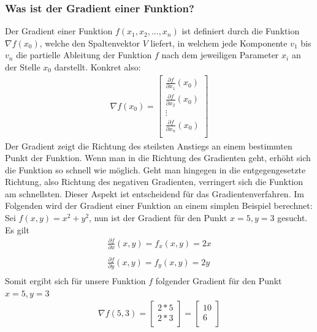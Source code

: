 \subsubsection{Was ist der Gradient einer Funktion?}\label{subsec:gradientenverfahren:was_ist_gradient}
  Der Gradient einer Funktion $f(x_{1}, x_{2}, ... , x_{n})$ ist definiert durch die Funktion $\nabla f(x_{0})$, welche den Spaltenvektor $V$ liefert, in welchem jede Komponente $v_1$ bis $v_n$ die partielle Ableitung der Funktion $f$ nach dem jeweiligen Parameter 
  $x_{i}$ an der Stelle $x_0$ darstellt. Konkret also: 
  \renewcommand{\arraystretch}{1.5}
  \begin{align*}
    \nabla f(x_0) =\begin{bmatrix}
          \frac{\partial f}{\partial x_{1}}(x_{0}) \\
          \frac{\partial f}{\partial x_{2}}(x_{0}) \\
           \vdots \\
           \frac{\partial f}{\partial x_{n}}(x_{0}) \\
         \end{bmatrix}
  \end{align*}
  \renewcommand{\arraystretch}{1}
  Der Gradient zeigt die Richtung des steilsten Anstiegs an einem bestimmten Punkt der Funktion. 
  Wenn man in die Richtung des Gradienten geht, erhöht sich die Funktion so schnell wie möglich. 
  Geht man hingegen in die entgegengesetzte Richtung, also Richtung des negativen Gradienten, verringert sich die Funktion am schnellsten.
  Dieser Aspekt ist entscheidend für das Gradientenverfahren.
  \bigbreak\noindent
  Im Folgenden wird der Gradient einer Funktion an einem simplen Beispiel berechnet: 
  \bigbreak\noindent
  Sei $f(x, y) = x^2 + y^2$, nun ist der Gradient für den Punkt $x = 5, y = 3$ gesucht. Es gilt
  \begin{align*}
    \frac{\partial f}{\partial x}(x,y) = f_{x}(x,y) = 2x\\
    \\
    \frac{\partial f}{\partial y}(x,y) = f_{y}(x,y) = 2y\\
  \end{align*}
  Somit ergibt sich für unsere Funktion $f$ folgender Gradient für den Punkt $x = 5, y = 3$ 
  \begin{align*}
    \nabla f(5, 3) = \begin{bmatrix}
      2 * 5\\
      2 * 3\\
    \end{bmatrix} = \begin{bmatrix}
      10\\
      6\\
    \end{bmatrix}
  \end{align*}
  \cite{CA18}

